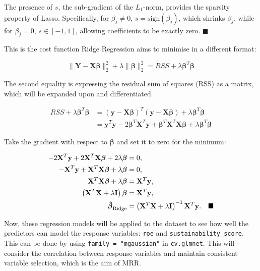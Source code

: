 \noindent The presence of \(s\), the sub-gradient of the \(L_1\)-norm, provides the sparsity property of Lasso. Specifically, for \(\beta_j \neq 0\), \(s = \text{sign}(\beta_j)\), which shrinks \(\beta_j\), while for \(\beta_j = 0\), \(s \in [-1, 1]\), allowing coefficients to be exactly zero. $\blacksquare$

This is the cost function Ridge Regression aims to minimise in a different format: 

\[
\|\boldsymbol{Y} - \boldsymbol{X\beta}\|_2^2 + \lambda \|\boldsymbol{\beta}\|_2^2 =
RSS + \lambda \boldsymbol{\beta}^T \boldsymbol{\beta}
\]


\noindent The second equality is expressing the residual sum of squares (RSS) as a matrix, which will be expanded upon and differentiated.

\begin{align*}
RSS + \lambda \boldsymbol{\beta}^T \boldsymbol{\beta} 
    &= (\mathbf{y} - \mathbf{X} \boldsymbol{\beta})^T (\mathbf{y} - \mathbf{X} \boldsymbol{\beta}) + \lambda \boldsymbol{\beta}^T \boldsymbol{\beta} \\
    &= \mathbf{y}^T \mathbf{y} - 2 \boldsymbol{\beta}^T \mathbf{X}^T \mathbf{y} + \boldsymbol{\beta}^T \mathbf{X}^T \mathbf{X} \boldsymbol{\beta} + \lambda \boldsymbol{\beta}^T \boldsymbol{\beta}
\end{align*}

\noindent Take the gradient with respect to $\boldsymbol{\beta}$ and set it to zero for the minimum:

\begin{align*}
-2 \mathbf{X}^T \mathbf{y} + 2 \mathbf{X}^T \mathbf{X} \boldsymbol{\beta} + 2 \lambda \boldsymbol{\beta} &= 0, \\
- \mathbf{X}^T \mathbf{y} + \mathbf{X}^T \mathbf{X} \boldsymbol{\beta} + \lambda \boldsymbol{\beta} &= 0, \\
\mathbf{X}^T \mathbf{X} \boldsymbol{\beta} + \lambda \boldsymbol{\beta} &= \mathbf{X}^T \mathbf{y}, \\
\left( \mathbf{X}^T \mathbf{X} + \lambda \mathbf{I} \right) \boldsymbol{\beta} &= \mathbf{X}^T \mathbf{y}, \\
\boldsymbol{\hat{\beta}}_{\text{Ridge}} &= \left( \mathbf{X}^T \mathbf{X} + \lambda \mathbf{I} \right)^{-1} \mathbf{X}^T \mathbf{y}.
\quad \hfill \blacksquare
\end{align*}

Now, these regression models will be applied to the dataset to see how well the predictors can model the response variables: \texttt{roe} and \texttt{sustainability\_score}. This can be done by using \texttt{family = "mgaussian"} in \texttt{cv.glmnet}. This will consider the correlation between response variables and maintain consistent variable selection, which is the aim of MRR.

